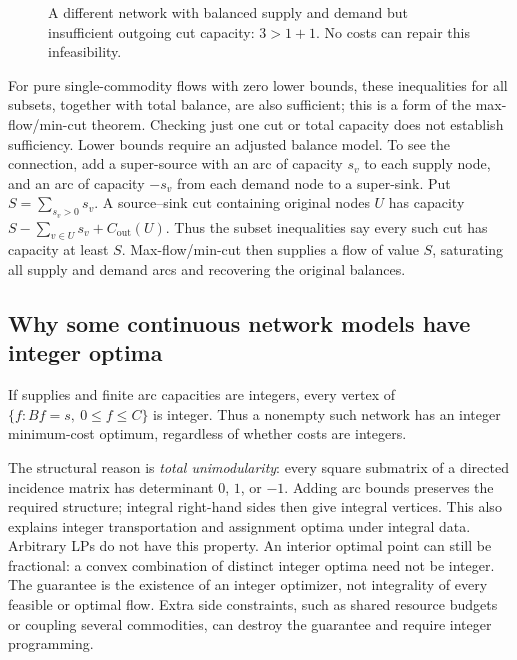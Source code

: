 \documentclass[11pt,a4paper]{article}
\begin{document}
\begin{figure}[H]
  \centering
  \caption{A different network with balanced supply and demand but insufficient
    outgoing cut capacity: $3>1+1$. No costs can repair this infeasibility.}
  \label{fig:cut-bottleneck}
\end{figure}
For pure single-commodity flows with zero lower bounds, these inequalities for
all subsets, together with total balance, are also sufficient; this is a form
of the max-flow/min-cut theorem. Checking just one cut or total capacity does
not establish sufficiency. Lower bounds require an adjusted balance model.
To see the connection, add a super-source with an arc of capacity $s_v$ to
each supply node, and an arc of capacity $-s_v$ from each demand node to a
super-sink. Put $S=\sum_{s_v>0}s_v$. A source--sink cut containing original
nodes $U$ has capacity $S-\sum_{v\in U}s_v+C_{\mathrm{out}}(U)$.
Thus the subset inequalities say every such cut has capacity at least $S$.
Max-flow/min-cut then supplies a flow of value $S$, saturating all supply and
demand arcs and recovering the original balances.

\subsection{Why some continuous network models have integer optima}\label{sec:network-integrality}
\begin{theorem}
  If supplies and finite arc capacities are integers, every vertex of
  $\{f:Bf=s,\ 0\leq f\leq C\}$ is integer. Thus a nonempty such network
  has an integer minimum-cost optimum, regardless of whether costs are integers.
\end{theorem}
The structural reason is \emph{total unimodularity}: every square submatrix
of a directed incidence matrix has determinant $0$, $1$, or $-1$.
Adding arc bounds preserves the required structure; integral right-hand sides
then give integral vertices. This also explains integer transportation and
assignment optima under integral data. Arbitrary LPs do not have this property.
An interior optimal point can still be fractional: a convex combination of
distinct integer optima need not be integer. The guarantee is the existence
of an integer optimizer, not integrality of every feasible or optimal flow.
Extra side constraints, such as shared resource budgets or coupling several
commodities, can destroy the guarantee and require integer programming.
\end{document}
